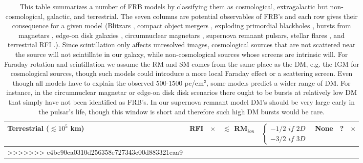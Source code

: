 \documentclass[useAMS,usenatbib]{mn2e}
\begin{document}
\begin{table}
\begin{tabularx}{1.08\textwidth}{@{\extracolsep{\fill}}|lccccccc|}
\multicolumn{1}{|l|}{Terrestrial ($\lesssim 10^5$ km)}                                                                             & RFI                                                         & $\times$                                                                         & $\lesssim$ RM$_{ion}$                                                          & $\left\{\begin{matrix}-1/2 \,\, if \,\, 2D \\ -3/2 \,\, if \,\, 3D\end{matrix}\right.$ & None                                                                        & ?                                                                       & $\times$                                                                  \\ \hline
>>>>>>> e4bc90ea0310d256358e727343e00d883321eaa9
\end{tabularx}
\caption{This table summarizes a number of FRB models by classifying them as cosmological, 
extragalactic but non-cosmological, galactic, and terrestrial. 
The seven columns are potential observables of FRB's and each
 row gives their consequence for a given model 
 (Blitzars \citep{2014A&A...562A.137F}, compact object mergers \citep{2012ApJ...760...64M, 2013PASJ...65L..12T},
 exploding primordial blackholes \citep{2014PhRvD..90l7503B}, bursts from magnetars \citep{2014MNRAS.442L...9L}, edge-on disk galaxies \citep{2015arXiv150400200X}, circumnuclear magnetars \citep{2015arXiv150101341P}, 
 supernova remnant pulsars, stellar flares \citep{2014MNRAS.439L..46L}, and terrestrial RFI 
 \citep{2015arXiv150305245H}.). Since scintillation
only affects unresolved images, cosmological sources that are not scattered near the source
will not scintillate in our galaxy, while non-cosmological sources whose screens are intrinsic will. 
For Faraday rotation and scintillation
 we assume 
the RM and SM comes from the same place as the DM, e.g. the IGM for cosmological sources, though such models 
could introduce a more local Faraday effect or a scattering screen.
Even though
all models have to explain the observed 500-1500 pc/cm$^3$, some models predict a wider 
range of DM. For instance, in the circumnuclear magnetar or edge-on disk disk scenarios there 
ought to be bursts at relatively low DM that simply have not been identified as FRB's. In our supernova 
remnant model DM's should be very large early in the pulsar's life, though this window is short and 
therefore such high DM bursts would be rare.}
\end{table}
\end{document}
